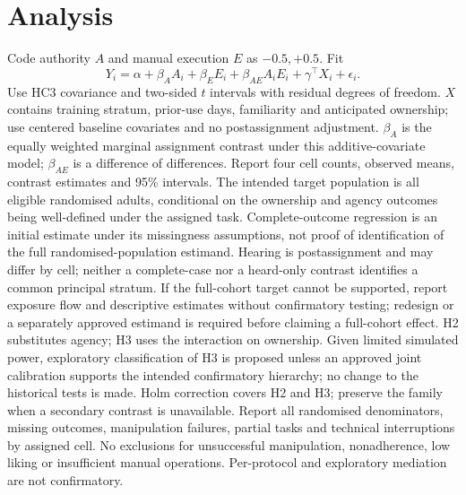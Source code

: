 \documentclass[11pt]{article}
\begin{document}
\section{Analysis}
Code authority $A$ and manual execution $E$ as $-0.5,+0.5$. Fit
\[
Y_i=\alpha+\beta_A A_i+\beta_E E_i+\beta_{AE}A_iE_i+\gamma^\top X_i+\epsilon_i.
\]
Use HC3 covariance and two-sided $t$ intervals with residual degrees of freedom. $X$ contains training stratum, prior-use days, familiarity and anticipated ownership; use centered baseline covariates and no postassignment adjustment. $\beta_A$ is the equally weighted marginal assignment contrast under this additive-covariate model; $\beta_{AE}$ is a difference of differences. Report four cell counts, observed means, contrast estimates and 95\% intervals. The intended target population is all eligible randomised adults, conditional on the ownership and agency outcomes being well-defined under the assigned task. Complete-outcome regression is an initial estimate under its missingness assumptions, not proof of identification of the full randomised-population estimand. Hearing is postassignment and may differ by cell; neither a complete-case nor a heard-only contrast identifies a common principal stratum. If the full-cohort target cannot be supported, report exposure flow and descriptive estimates without confirmatory testing; redesign or a separately approved estimand is required before claiming a full-cohort effect. H2 substitutes agency; H3 uses the interaction on ownership. Given limited simulated power, exploratory classification of H3 is proposed unless an approved joint calibration supports the intended confirmatory hierarchy; no change to the historical tests is made. Holm correction covers H2 and H3; preserve the family when a secondary contrast is unavailable. Report all randomised denominators, missing outcomes, manipulation failures, partial tasks and technical interruptions by assigned cell. No exclusions for unsuccessful manipulation, nonadherence, low liking or insufficient manual operations. Per-protocol and exploratory mediation are not confirmatory.
\end{document}
